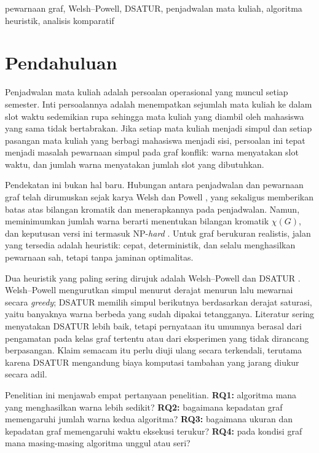 \documentclass[conference,a4paper]{IEEEtran}
\begin{document}
\begin{IEEEkeywords}
pewarnaan graf, Welsh--Powell, DSATUR, penjadwalan mata kuliah, algoritma
heuristik, analisis komparatif
\end{IEEEkeywords}

\section{Pendahuluan}
Penjadwalan mata kuliah adalah persoalan operasional yang muncul setiap
semester. Inti persoalannya adalah menempatkan sejumlah mata kuliah ke dalam
slot waktu sedemikian rupa sehingga mata kuliah yang diambil oleh mahasiswa yang
sama tidak bertabrakan. Jika setiap mata kuliah menjadi simpul dan setiap
pasangan mata kuliah yang berbagi mahasiswa menjadi sisi, persoalan ini tepat
menjadi masalah pewarnaan simpul pada graf konflik: warna menyatakan slot waktu,
dan jumlah warna menyatakan jumlah slot yang dibutuhkan.

Pendekatan ini bukan hal baru. Hubungan antara penjadwalan dan pewarnaan graf
telah dirumuskan sejak karya Welsh dan Powell \cite{welsh1967upper}, yang
sekaligus memberikan batas atas bilangan kromatik dan menerapkannya pada
penjadwalan. Namun, meminimumkan jumlah warna berarti menentukan bilangan
kromatik $\chi(G)$, dan keputusan versi ini termasuk NP-\emph{hard}
\cite{karp1972reducibility,garey1979computers}. Untuk graf berukuran realistis,
jalan yang tersedia adalah heuristik: cepat, deterministik, dan selalu
menghasilkan pewarnaan sah, tetapi tanpa jaminan optimalitas.

Dua heuristik yang paling sering dirujuk adalah Welsh--Powell
\cite{welsh1967upper} dan DSATUR \cite{brelaz1979new}. Welsh--Powell mengurutkan
simpul menurut derajat menurun lalu mewarnai secara \emph{greedy}; DSATUR
memilih simpul berikutnya berdasarkan derajat saturasi, yaitu banyaknya warna
berbeda yang sudah dipakai tetangganya. Literatur sering menyatakan DSATUR
lebih baik, tetapi pernyataan itu umumnya berasal dari pengamatan pada kelas
graf tertentu atau dari eksperimen yang tidak dirancang berpasangan. Klaim
semacam itu perlu diuji ulang secara terkendali, terutama karena DSATUR
mengandung biaya komputasi tambahan yang jarang diukur secara adil.

Penelitian ini menjawab empat pertanyaan penelitian. \textbf{RQ1:} algoritma
mana yang menghasilkan warna lebih sedikit? \textbf{RQ2:} bagaimana kepadatan
graf memengaruhi jumlah warna kedua algoritma? \textbf{RQ3:} bagaimana ukuran
dan kepadatan graf memengaruhi waktu eksekusi terukur? \textbf{RQ4:} pada
kondisi graf mana masing-masing algoritma unggul atau seri?
\end{document}
